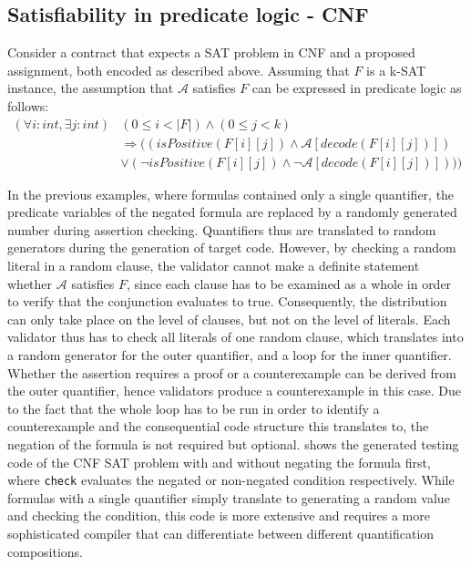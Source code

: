 \subsection{Satisfiability in predicate logic - CNF}
Consider a contract that expects a SAT problem in CNF and a proposed assignment, both encoded as described above. Assuming that $F$ is a k-SAT instance, the assumption that $\mathcal{A}$ satisfies $F$ can be expressed in predicate logic as follows:
\begin{equation}\label{eq:cnf_sat}
\begin{aligned}
(\forall i : int, \exists j : int) &(0 \leq i < |F|) \wedge (0 \leq j < k) \\
&\Rightarrow ((isPositive(F[i][j]) \wedge \mathcal{A}[decode(F[i][j])]) \\
&\vee (\neg isPositive(F[i][j]) \wedge \neg \mathcal{A}[decode(F[i][j])])))
\end{aligned}
\end{equation}

In the previous examples, where formulas contained only a single quantifier, the predicate variables of the negated formula are replaced by a randomly generated number during assertion checking. Quantifiers thus are translated to random generators during the generation of target code. However, by checking a random literal in a random clause, the validator cannot make a definite statement whether $\mathcal{A}$ satisfies $F$, since each clause has to be examined as a whole in order to verify that the conjunction evaluates to true. Consequently, the distribution can only take place on the level of clauses, but not on the level of literals. Each validator thus has to check all literals of one random clause, which translates into a random generator for the outer quantifier, and a loop for the inner quantifier. Whether the assertion requires a proof or a counterexample can be derived from the outer quantifier, hence validators produce a counterexample in this case. Due to the fact that the whole loop has to be run in order to identify a counterexample and the consequential code structure this translates to, the negation of the formula is not required but optional.  shows the generated testing code of the CNF SAT problem with and without negating the formula first, where \texttt{check} evaluates the negated or non-negated condition respectively. While formulas with a single quantifier simply translate to generating a random value and checking the condition, this code is more extensive and requires a more sophisticated compiler that can differentiate between different quantification compositions.

